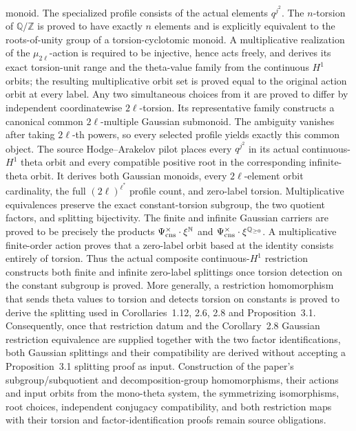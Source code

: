 \begin{definition}
  monoid.  The specialized profile consists of the actual elements
  \(q^{j^2}\).  The \(n\)-torsion of \(\mathbb Q/\mathbb Z\) is proved to
  have exactly \(n\) elements and is explicitly equivalent to the
  roots-of-unity group of a torsion-cyclotomic monoid.  A multiplicative
  realization of the \(\mu_{2\ell}\)-action is required to be injective,
  hence acts freely, and derives its exact torsion-unit range and the
  theta-value family from the continuous \(H^1\) orbits; the resulting
  multiplicative orbit set is proved equal to the original action orbit at
  every label.  Any two
  simultaneous choices from it are proved to differ by independent
  coordinatewise \(2\ell\)-torsion.  Its representative family constructs a
  canonical common \(2\ell\)-multiple Gaussian submonoid.  The ambiguity
  vanishes after taking \(2\ell\)-th powers, so every selected profile yields
  exactly this common object.  The source Hodge--Arakelov pilot places every
  \(q^{j^2}\) in its actual continuous-\(H^1\) theta orbit and every
  compatible positive root in the corresponding infinite-theta orbit.  It
  derives both Gaussian monoids, every \(2\ell\)-element orbit cardinality,
  the full \((2\ell)^{\ell^\ast}\) profile count, and zero-label torsion.
  Multiplicative equivalences preserve the exact
  constant-torsion subgroup, the two quotient factors, and splitting
  bijectivity.  The finite and infinite Gaussian carriers are proved to be
  precisely the products
  \(\Psi_{\rm cns}^{\times}\cdot\xi^{\mathbb N}\) and
  \(\Psi_{\rm cns}^{\times}\cdot\xi^{\mathbb Q_{\geq 0}}\).
  A multiplicative finite-order action proves that a zero-label orbit based at
  the identity consists entirely of torsion.  Thus the actual composite
  continuous-\(H^1\) restriction constructs both finite and infinite
  zero-label splittings once torsion detection on the constant subgroup is
  proved.  More generally, a restriction homomorphism that sends theta values to torsion and detects
  torsion on constants is proved to derive the splitting used in
  Corollaries~1.12, 2.6, 2.8 and Proposition~3.1.  Consequently, once that
  restriction datum and the Corollary~2.8 Gaussian restriction equivalence
  are supplied together with the two factor identifications, both Gaussian
  splittings and their compatibility are derived without accepting a
  Proposition~3.1 splitting proof as input.
  Construction of the paper's
  subgroup/subquotient and decomposition-group homomorphisms, their actions
  and input orbits from the mono-theta system, the symmetrizing isomorphisms,
  root choices, independent conjugacy compatibility, and both restriction
  maps with their torsion and factor-identification proofs remain source
  obligations.
\end{definition}

